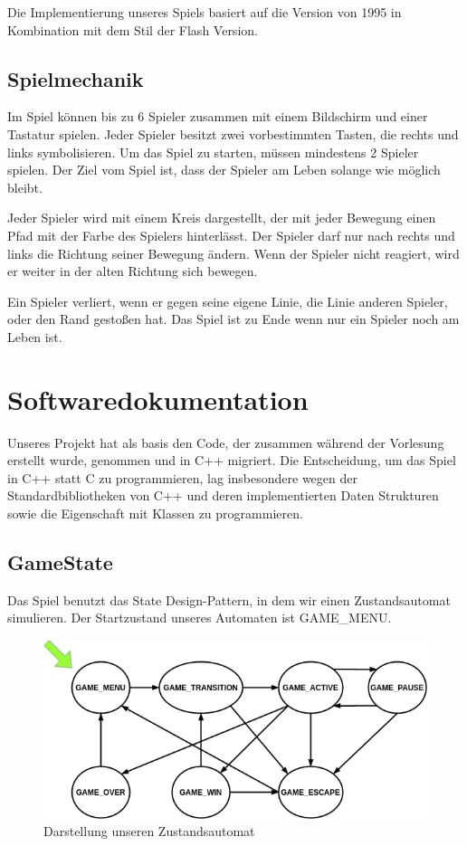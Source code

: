 \documentclass[doktyp=studarbeit]{TUBAFarbeiten}
\begin{document}
Die Implementierung unseres Spiels basiert auf die Version von 1995 in 
Kombination mit dem Stil der Flash Version.

\subsection{Spielmechanik}

Im Spiel können bis zu 6 Spieler zusammen mit einem Bildschirm und einer 
Tastatur spielen. Jeder Spieler besitzt zwei vorbestimmten Tasten, die rechts 
und links symbolisieren. Um das Spiel zu starten, müssen mindestens 
2 Spieler spielen.  Der Ziel vom Spiel ist, dass der Spieler am Leben 
solange wie möglich bleibt.

Jeder Spieler wird mit einem Kreis dargestellt, der mit jeder Bewegung einen 
Pfad mit der Farbe des Spielers hinterlässt. Der Spieler darf nur nach rechts 
und links die Richtung seiner Bewegung ändern. Wenn der Spieler nicht reagiert, 
wird er weiter in der alten Richtung sich bewegen.

Ein Spieler verliert, wenn er gegen seine eigene Linie, die Linie anderen 
Spieler,  oder den Rand gestoßen hat. Das Spiel ist zu Ende wenn nur ein 
Spieler noch am Leben ist.

\section{Softwaredokumentation}

Unseres Projekt hat als basis den Code, der zusammen während der Vorlesung 
erstellt wurde, genommen und in C++ migriert. 
Die Entscheidung, um das Spiel in C++ statt C zu programmieren, lag 
insbesondere wegen der Standardbibliotheken von C++ und deren implementierten 
Daten Strukturen sowie die Eigenschaft mit Klassen zu programmieren.

\subsection{GameState}

Das Spiel benutzt das State Design-Pattern, in dem wir einen Zustandsautomat
simulieren. Der Startzustand unseres Automaten ist GAME\_MENU. 

\begin{figure}
    \centering
    \includegraphics[width=0.7\linewidth]{state_machine.png}
	\caption{Darstellung unseren Zustandsautomat}
	\label{fig:state-machine}
\end{figure}
\end{document}
